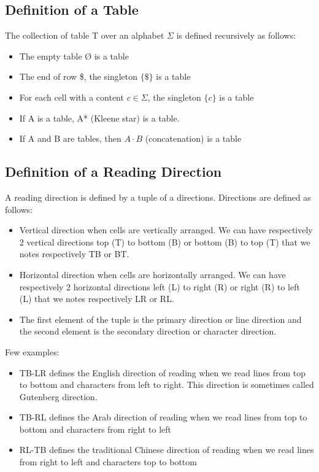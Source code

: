 \documentclass{article}
\begin{document}
\subsection{Definition of a Table}
The collection of table T over an alphabet $\Sigma$ is defined recursively as follows:
\begin{itemize}
    \item The empty table Ø is a table
    \item The end of row \$, the singleton $\{\$\}$ is a table
    \item For each cell with a content $c \in \Sigma$, the singleton $\{c\}$ is a table
    \item If A is a table, A* (Kleene star) is a table.
    \item If A and B are tables, then $A \cdot B$ (concatenation) is a table
\end{itemize}

\subsection{Definition of a Reading Direction}
A reading direction is defined by a tuple of a directions. Directions are defined as follows:
\begin{itemize}
    \item Vertical direction when cells are vertically arranged. We can have respectively 2 vertical directions top (T)
    to bottom (B) or bottom (B) to top (T) that we notes respectively TB or BT. 
    \item Horizontal direction when cells are horizontally arranged. We can have respectively 2 horizontal directions
    left (L) to right (R) or right (R) to left (L) that we notes respectively LR or RL. 
    \item The first element of the tuple is the primary direction or line direction and the second element is the
    secondary direction or character direction.
\end{itemize}
Few examples:
\begin{itemize}
    \item TB-LR defines the English direction of reading when we read lines from top to bottom and characters from left
    to right. This direction is sometimes called Gutenberg direction.
    \item TB-RL defines the Arab direction of reading when we read lines from top to bottom and characters from right to
    left
    \item RL-TB defines the traditional Chinese direction of reading when we read lines from right to left and
    characters top to bottom
\end{itemize}
\end{document}

